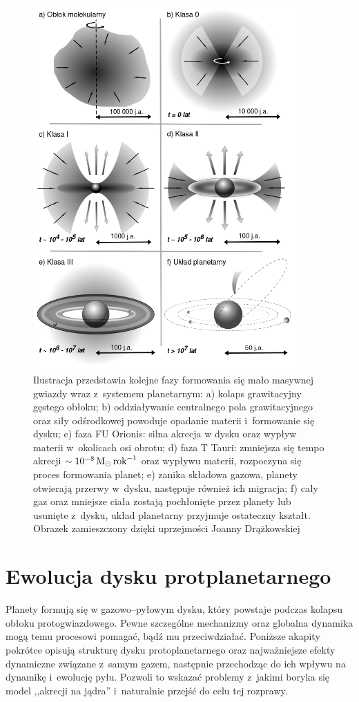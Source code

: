 \begin{figure}[p]
\centering 
\includegraphics[width=0.9\textwidth]{figures/planetformation.png}
\caption{Ilustracja przedstawia kolejne fazy formowania się mało masywnej gwiazdy
   wraz z~systemem planetarnym: a) kolaps grawitacyjny gęstego obłoku; b)
   oddziaływanie centralnego pola grawitacyjnego oraz siły odśrodkowej powoduje
   opadanie materii i~formowanie się dysku; c) faza FU Orionis: silna akrecja w
   dysku oraz wypływ materii w~okolicach osi obrotu; d) faza T Tauri: zmniejsza
   się tempo akrecji $\sim 10^{-8}\hbox{$\mathrm{\thinspace M_{\odot}}$}\hbox{$\thinspace\textrm{rok}$}^{-1}$ oraz wypływu materii,
   rozpoczyna się proces formowania planet; e) zanika składowa gazowa, planety
otwierają przerwy w~dysku, następuje również ich migracja; f) cały gaz oraz
mniejsze ciała zostają pochłonięte przez planety lub usunięte z~dysku, układ
planetarny przyjmuje ostateczny kształt. Obrazek zamieszczony dzięki uprzejmości
Joanny Drążkowskiej}

\label{fig:planet}
\end{figure}

\section{Ewolucja dysku protplanetarnego}
Planety formują się w gazowo--pyłowym dysku, który powstaje podczas kolapsu
obłoku protogwiazdowego. Pewne szczególne mechanizmy oraz globalna dynamika mogą
temu procesowi pomagać, bądź mu przeciwdziałać. Poniższe akapity pokrótce
opisują strukturę dysku protoplanetarnego oraz najważniejsze efekty dynamiczne
związane z~samym gazem, następnie przechodząc do ich wpływu na dynamikę
i~ewolucję pyłu. Pozwoli to wskazać problemy z~jakimi boryka się model ,,akrecji
na jądra'' i~naturalnie przejść do celu tej rozprawy.

